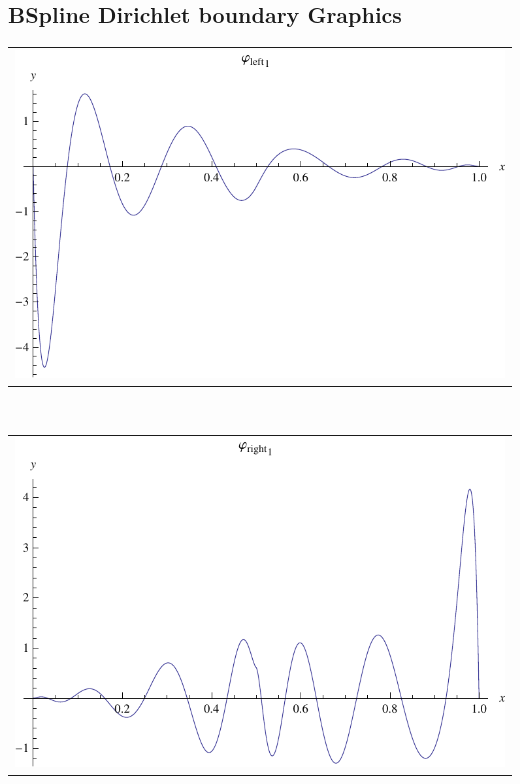 \documentclass{article}
\begin{document}
\begin{landscape}
\subsection{BSpline Dirichlet boundary Graphics}
\begin{tabular}{c}
\includegraphics[width=20.cm]{decic_bspline_dleft_1.pdf}\end{tabular} 
 \\ 
\begin{tabular}{c}
\includegraphics[width=20.cm]{decic_bspline_dright_1.pdf}\end{tabular} 
 \end{landscape}
\end{document}
